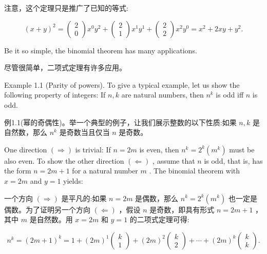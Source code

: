 \documentclass[10pt]{article}
\begin{document}
\begin{tcolorbox}\relax
注意，这个定理只是推广了已知的等式:
\end{tcolorbox}

\[
{\left( x + y\right) }^{2} = \left( \begin{array}{l} 2 \\  0 \end{array}\right) {x}^{0}{y}^{2} + \left( \begin{array}{l} 2 \\  1 \end{array}\right) {x}^{1}{y}^{1} + \left( \begin{array}{l} 2 \\  2 \end{array}\right) {x}^{2}{y}^{0} = {x}^{2} + {2xy} + {y}^{2}.
\]

Be it so simple, the binomial theorem has many applications.

\begin{tcolorbox}\relax
尽管很简单，二项式定理有许多应用。
\end{tcolorbox}

Example 1.1 (Parity of powers). To give a typical example, let us show the following property of integers: If \(n,k\) are natural numbers, then \({n}^{k}\) is odd iff \(n\) is odd.

\begin{tcolorbox}\relax
例1.1(幂的奇偶性)。举一个典型的例子，让我们展示整数的以下性质:如果 \(n,k\) 是自然数，那么 \({n}^{k}\) 是奇数当且仅当 \(n\) 是奇数。
\end{tcolorbox}

One direction \(\left(  \Rightarrow  \right)\) is trivial: If \(n = {2m}\) is even, then \({n}^{k} = {2}^{k}\left( {m}^{k}\right)\) must be also even. To show the other direction \(\left(  \Leftarrow  \right)\) , assume that \(n\) is odd, that is, has the form \(n = {2m} + 1\) for a natural number \(m\) . The binomial theorem with \(x = {2m}\) and \(y = 1\) yields:

\begin{tcolorbox}\relax
一个方向 \(\left(  \Rightarrow  \right)\) 是平凡的:如果 \(n = {2m}\) 是偶数，那么 \({n}^{k} = {2}^{k}\left( {m}^{k}\right)\) 也一定是偶数。为了证明另一个方向 \(\left(  \Leftarrow  \right)\) ，假设 \(n\) 是奇数，即具有形式 \(n = {2m} + 1\) ，其中 \(m\) 是自然数。用 \(x = {2m}\) 和 \(y = 1\) 的二项式定理可得:
\end{tcolorbox}

\[
{n}^{k} = {\left( 2m + 1\right) }^{k} = 1 + {\left( 2m\right) }^{1}\left( \begin{array}{l} k \\  1 \end{array}\right)  + {\left( 2m\right) }^{2}\left( \begin{array}{l} k \\  2 \end{array}\right)  + \cdots  + {\left( 2m\right) }^{k}\left( \begin{array}{l} k \\  k \end{array}\right) .
\]
\end{document}
